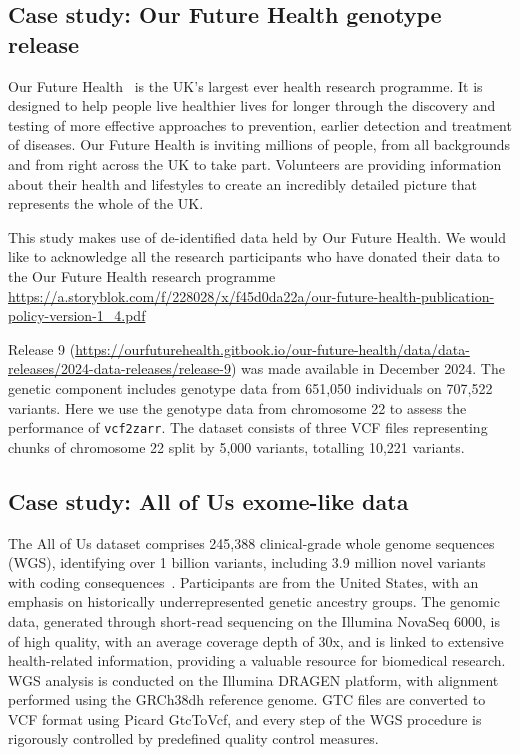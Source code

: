 \documentclass[a4paper,num-refs]{oup-contemporary}
\begin{document}
\subsection{Case study: Our Future Health genotype release}
Our Future Health~\cite{ofhmain_2025} is the UK’s largest ever health research programme. 
It is designed to help people live healthier lives for longer through the 
discovery and testing of more effective approaches to prevention, earlier 
detection and treatment of diseases.
Our Future Health is inviting millions of people, from all backgrounds and 
from right across the UK to take part. Volunteers are providing information 
about their health and lifestyles to create an incredibly detailed picture 
that represents the whole of the UK. 

This study makes use of de-identified data held by Our Future Health. 
We would like to acknowledge all the research participants who have donated 
their data to the Our Future Health research programme 
\url{https://a.storyblok.com/f/228028/x/f45d0da22a/our-future-health-publication-policy-version-1_4.pdf}

Release 9 (\url{https://ourfuturehealth.gitbook.io/our-future-health/data/data-releases/2024-data-releases/release-9}) 
was made available in December 2024. The genetic component includes genotype data 
from 651,050 individuals on 707,522 variants. Here we use the genotype data from 
chromosome 22 to assess the performance of \texttt{vcf2zarr}. The dataset consists of
three VCF files representing chunks of chromosome 22 split by 5,000 variants, totalling 
10,221 variants. 

\subsection{Case study: All of Us exome-like data} 
The All of Us dataset comprises 245,388 clinical-grade whole genome sequences (WGS), 
identifying over 1 billion variants, including 3.9 million novel variants 
with coding consequences~\citep{all2024genomic}. Participants are from the United States, 
with an emphasis on historically underrepresented genetic ancestry groups. 
The genomic data, generated through short-read sequencing on the Illumina NovaSeq 6000, 
is of high quality, with an average coverage depth of 30x, and is linked to extensive 
health-related information, providing a valuable resource for biomedical research. 
WGS analysis is conducted on the Illumina DRAGEN platform, with alignment performed 
using the GRCh38dh reference genome. GTC files are converted to VCF format using 
Picard GtcToVcf, and every step of the WGS procedure is rigorously controlled by 
predefined quality control measures.
\end{document}
